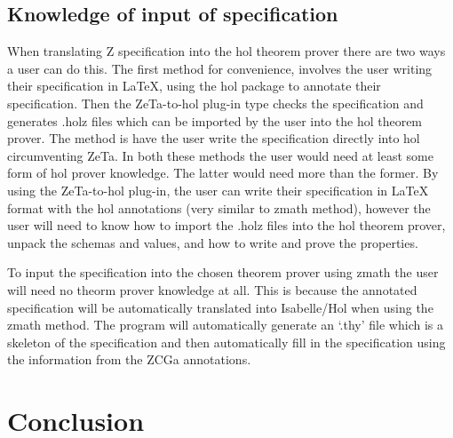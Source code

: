 \subsection{Knowledge of input of specification}
\label{knowledgeofinputforbb}

When translating Z specification into the \gls{hol} theorem prover there are two ways a user can do this. The first method for convenience, involves the user writing their specification in \LaTeX{}, using the \gls{hol} package to annotate their specification. Then the ZeTa-to-\gls{hol} plug-in type checks the specification and generates .holz files which can be imported by the user into the \gls{hol} theorem prover. The method is have the user write the specification directly into \gls{hol} circumventing ZeTa.
In both these methods the user would need at least some form of \gls{hol} prover knowledge. The latter would need more than the former. By using the ZeTa-to-\gls{hol} plug-in, the user can write their specification in \LaTeX{} format with the \gls{hol} annotations (very similar to \gls{zmath} method), however the user will need to know how to import the .holz files into the \gls{hol} theorem prover, unpack the schemas and values, and how to write and prove the properties. 

To input the specification into the chosen theorem prover using \gls{zmath} the user will need no theorm prover knowledge at all. This is because the annotated specification will be automatically translated into Isabelle/Hol when using the \gls{zmath} method. The program will automatically generate an `.thy' file which is a skeleton of the specification and then automatically fill in the specification using the information from the ZCGa annotations.

\section{Conclusion}

